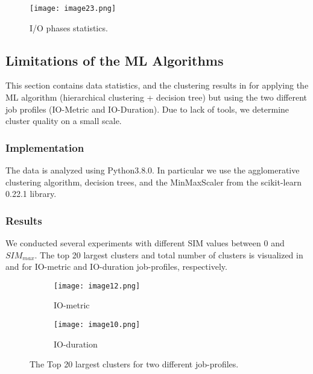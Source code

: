 \documentclass{jhps}
\begin{document}


\begin{figure}
  \centering
  \texttt{[image: image23.png]}
  \caption{I/O phases statistics.}
  \label{fig:phases_stats}
\end{figure}


\subsection{Limitations of the ML Algorithms}
This section contains data statistics, and the clustering results in  for applying the ML algorithm (hierarchical clustering + decision tree) but using the two different job profiles (IO-Metric and IO-Duration).
Due to lack of tools, we determine cluster quality on a small scale.

\subsubsection{Implementation}
The data is analyzed using Python3.8.0.
In particular we use the agglomerative clustering algorithm, decision trees, and the MinMaxScaler from the scikit-learn 0.22.1 library.


\subsubsection{Results}
We conducted several experiments with different SIM values between 0 and $SIM_{max}$.
The top 20 largest clusters and total number of clusters is visualized in  and  for IO-metric and IO-duration job-profiles, respectively.

\begin{figure}
 \begin{subfigure}[t]{0.45\textwidth}
	\texttt{[image: image12.png]}
	\caption{IO-metric}
	\label{fig:datasets_clustering_results:io_metric}
 \end{subfigure}
 \hfill
	\begin{subfigure}[t]{0.45\textwidth}
	\texttt{[image: image10.png]}
	\caption{IO-duration}
	\label{fig:datasets_clustering_results:io_duration}
 \end{subfigure}

 \caption{The Top 20 largest clusters for two different job-profiles.}
 \label{fig:datasets_clustering_results}
\end{figure}
\end{document}
